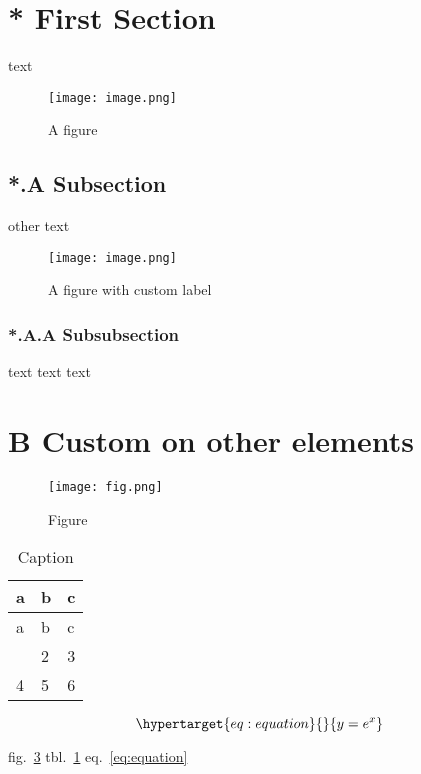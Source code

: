\hypertarget{first-section}{%
\section{* First Section}\label{first-section}}

text

\begin{figure}
\hypertarget{fig:fig1}{%
\centering
\texttt{[image: image.png]}
\caption{A figure}\label{fig:fig1}
}
\end{figure}

\hypertarget{subsection}{%
\subsection{*.A Subsection}\label{subsection}}

other text

\begin{figure}
\hypertarget{fig:fig2}{%
\centering
\texttt{[image: image.png]}
\caption{A figure with custom label}\label{fig:fig2}
}
\end{figure}

\hypertarget{subsubsection}{%
\subsubsection{*.A.A Subsubsection}\label{subsubsection}}

text text text

\hypertarget{custom-on-other-elements}{%
\section{B Custom on other elements}\label{custom-on-other-elements}}

\begin{figure}
\hypertarget{fig:fig3}{%
\centering
\texttt{[image: fig.png]}
\caption{Figure}\label{fig:fig3}
}
\end{figure}

\hypertarget{tbl:table}{}
\begin{longtable}[]{@{}lll@{}}
\caption{\label{tbl:table}Caption}\tabularnewline
\toprule\noalign{}
a & b & c \\
\midrule\noalign{}
\endfirsthead
\toprule\noalign{}
a & b & c \\
\midrule\noalign{}
\endhead
\bottomrule\noalign{}
\endlastfoot
1 & 2 & 3 \\
4 & 5 & 6 \\
\end{longtable}

\begin{equation}\protect\hypertarget{eq:equation}{}{y = e^x}\label{eq:equation}\end{equation}

fig.~\ref{fig:fig3} tbl.~\ref{tbl:table} eq.~\ref{eq:equation}
